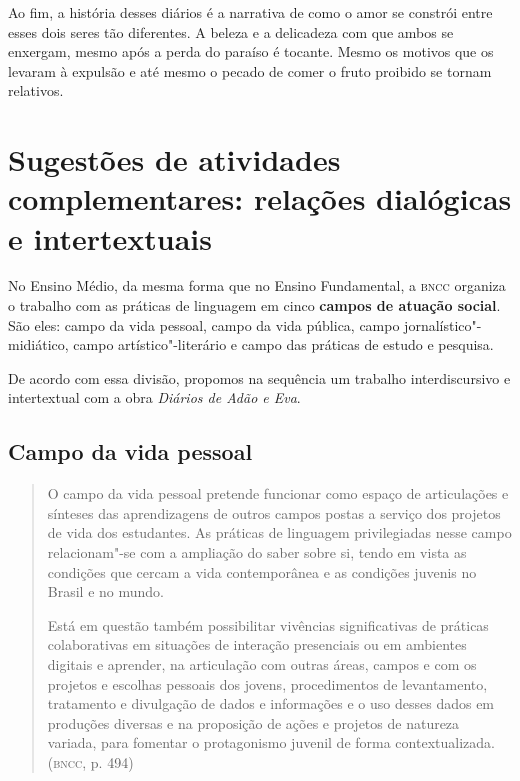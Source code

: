 \documentclass[12pt]{extarticle}
\begin{document}
Ao fim, a história desses diários é a narrativa de como o amor se
constrói entre esses dois seres tão diferentes. A beleza e a delicadeza
com que ambos se enxergam, mesmo após a perda do paraíso é tocante.
Mesmo os motivos que os levaram à expulsão e até mesmo o pecado de comer
o fruto proibido se tornam relativos.


\section{Sugestões de atividades complementares: relações dialógicas e
intertextuais}


No Ensino Médio, da mesma forma que no Ensino Fundamental, a \textsc{bncc}
organiza o trabalho com as práticas de linguagem em cinco \textbf{campos
de atuação social}. São eles: campo da vida pessoal, campo da vida
pública, campo jornalístico"-midiático, campo artístico"-literário e campo
das práticas de estudo e pesquisa.

De acordo com essa divisão, propomos na sequência um trabalho
interdiscursivo e intertextual com a obra \emph{Diários de Adão e Eva}.

\subsection{Campo da vida pessoal}

\begin{quote}
O campo da vida pessoal pretende funcionar como espaço de articulações
e sínteses das aprendizagens de outros campos postas a serviço dos
projetos de vida dos estudantes. As práticas de linguagem privilegiadas
nesse campo relacionam"-se com a ampliação do saber sobre si, tendo em
vista as condições que cercam a vida contemporânea e as condições
juvenis no Brasil e no mundo.

Está em questão também possibilitar vivências significativas de práticas
colaborativas em situações de interação presenciais ou em ambientes
digitais e aprender, na articulação com outras áreas, campos e com os
projetos e escolhas pessoais dos jovens, procedimentos de levantamento,
tratamento e divulgação de dados e informações e o uso desses dados em
produções diversas e na proposição de ações e projetos de natureza
variada, para fomentar o protagonismo juvenil de forma
contextualizada. (\textsc{bncc}, p. 494)
\end{quote}
\end{document}
